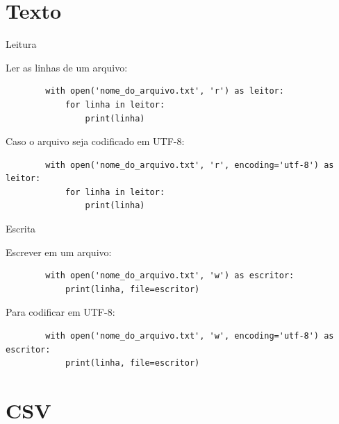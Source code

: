 	




\section{Texto}

\begin{frame}[containsverbatim]{Leitura}

	Ler as linhas de um arquivo:

	\begin{verbatim}
		with open('nome_do_arquivo.txt', 'r') as leitor:			
			for linha in leitor:				
				print(linha)
	\end{verbatim}
	
	\vfill
	
	Caso o arquivo seja codificado em UTF-8:
	
	\begin{verbatim}
		with open('nome_do_arquivo.txt', 'r', encoding='utf-8') as leitor:			
			for linha in leitor:				
				print(linha)
	\end{verbatim}
\end{frame}

\begin{frame}[containsverbatim]{Escrita}
	
	Escrever em um arquivo:
	
	\begin{verbatim}
		with open('nome_do_arquivo.txt', 'w') as escritor:			
			print(linha, file=escritor)
	\end{verbatim}
	
	\vfill
	
	Para codificar em UTF-8:
	
	\begin{verbatim}
		with open('nome_do_arquivo.txt', 'w', encoding='utf-8') as escritor:									
			print(linha, file=escritor)
	\end{verbatim}
\end{frame}

\section{CSV}

